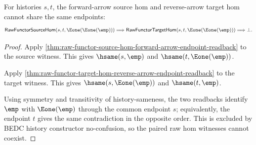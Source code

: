 \begin{theorem}
\label{thm:raw-functor-opposite-arrow-same-endpoint-absurd}
For histories $s,t$, the forward-arrow source hom and reverse-arrow target hom
cannot share the same endpoints:
$$
\mathsf{RawFunctorSourceHom}(s,t,\Eone(\Eone(\emp)))
\Longrightarrow
\mathsf{RawFunctorTargetHom}(s,t,\Eone(\Eone(\emp)))
\Longrightarrow
\bot.
$$
\end{theorem}
\begin{proof}
Apply \autoref{thm:raw-functor-source-hom-forward-arrow-endpoint-readback} to
the source witness. This gives $\hsame(s,\emp)$ and
$\hsame(t,\Eone(\emp))$.

Apply \autoref{thm:raw-functor-target-hom-reverse-arrow-endpoint-readback} to
the target witness. This gives $\hsame(s,\Eone(\emp))$ and
$\hsame(t,\emp)$.

Using symmetry and transitivity of history-sameness, the two readbacks identify
$\emp$ with $\Eone(\emp)$ through the common endpoint $s$; equivalently, the
endpoint $t$ gives the same contradiction in the opposite order. This is
excluded by BEDC history constructor no-confusion, so the paired raw hom
witnesses cannot coexist.
\end{proof}

